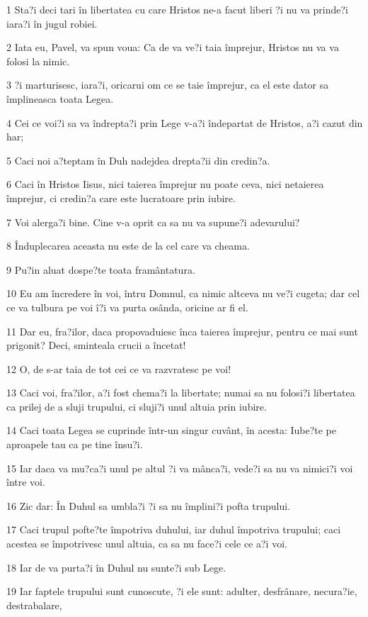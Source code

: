 \par 1 Sta?i deci tari în libertatea cu care Hristos ne-a facut liberi ?i nu va prinde?i iara?i în jugul robiei.
\par 2 Iata eu, Pavel, va spun voua: Ca de va ve?i taia împrejur, Hristos nu va va folosi la nimic.
\par 3 ?i marturisesc, iara?i, oricarui om ce se taie împrejur, ca el este dator sa împlineasca toata Legea.
\par 4 Cei ce voi?i sa va îndrepta?i prin Lege v-a?i îndepartat de Hristos, a?i cazut din har;
\par 5 Caci noi a?teptam în Duh nadejdea drepta?ii din credin?a.
\par 6 Caci în Hristos Iisus, nici taierea împrejur nu poate ceva, nici netaierea împrejur, ci credin?a care este lucratoare prin iubire.
\par 7 Voi alerga?i bine. Cine v-a oprit ca sa nu va supune?i adevarului?
\par 8 Înduplecarea aceasta nu este de la cel care va cheama.
\par 9 Pu?in aluat dospe?te toata framântatura.
\par 10 Eu am încredere în voi, întru Domnul, ca nimic altceva nu ve?i cugeta; dar cel ce va tulbura pe voi î?i va purta osânda, oricine ar fi el.
\par 11 Dar eu, fra?ilor, daca propovaduiesc înca taierea împrejur, pentru ce mai sunt prigonit? Deci, sminteala crucii a încetat!
\par 12 O, de s-ar taia de tot cei ce va razvratesc pe voi!
\par 13 Caci voi, fra?ilor, a?i fost chema?i la libertate; numai sa nu folosi?i libertatea ca prilej de a sluji trupului, ci sluji?i unul altuia prin iubire.
\par 14 Caci toata Legea se cuprinde într-un singur cuvânt, în acesta: Iube?te pe aproapele tau ca pe tine însu?i.
\par 15 Iar daca va mu?ca?i unul pe altul ?i va mânca?i, vede?i sa nu va nimici?i voi între voi.
\par 16 Zic dar: În Duhul sa umbla?i ?i sa nu împlini?i pofta trupului.
\par 17 Caci trupul pofte?te împotriva duhului, iar duhul împotriva trupului; caci acestea se împotrivesc unul altuia, ca sa nu face?i cele ce a?i voi.
\par 18 Iar de va purta?i în Duhul nu sunte?i sub Lege.
\par 19 Iar faptele trupului sunt cunoscute, ?i ele sunt: adulter, desfrânare, necura?ie, destrabalare,
